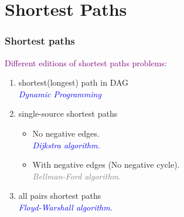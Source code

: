 
\section{Shortest Paths}

\begin{frame}
  \frametitle{Shortest paths}

  \textcolor{purple}{Different editions of shortest paths problems:}
  \begin{enumerate}
    \item shortest(longest) path in DAG  \\
      \emph{\textcolor{blue}{Dynamic Programming}}
    \item single-source shortest paths
      \begin{itemize}
        \item No negative edges. \\
          \emph{\textcolor{blue}{Dijkstra algorithm.}}
        \item With negative edges (No negative cycle). \\
          \emph{\textcolor{gray}{Bellman-Ford algorithm.}}
      \end{itemize}
    \item all pairs shortest paths \\
      \emph{\textcolor{blue}{Floyd-Warshall algorithm.}}
  \end{enumerate}

\end{frame}

%
%
%


